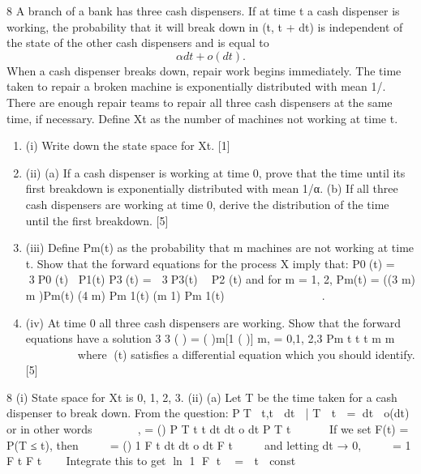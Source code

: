 \documentclass[a4paper,12pt]{article}
\begin{document}
8 A branch of a bank has three cash dispensers. If at time t a cash dispenser is working,
the probability that it will break down in (t, t + dt) is independent of the state of the
other cash dispensers and is equal to
\[\alpha dt + o(dt).\]
When a cash dispenser breaks down, repair work begins immediately. The time taken
to repair a broken machine is exponentially distributed with mean 1/\beta. There are
enough repair teams to repair all three cash dispensers at the same time, if necessary.
Define Xt as the number of machines not working at time t.
\begin{enumerate}
\item (i) Write down the state space for Xt. [1]
\item (ii) (a) If a cash dispenser is working at time 0, prove that the time until its
first breakdown is exponentially distributed with mean 1/α.
(b) If all three cash dispensers are working at time 0, derive the
distribution of the time until the first breakdown. [5]
\item (iii) Define Pm(t) as the probability that m machines are not working at time t.
Show that the forward equations for the process X imply that:
P0(t) = 3P0 (t) P1(t)
P3(t) =  3P3(t)  P2 (t)
and for m = 1, 2,
Pm(t) = ((3 m) m )Pm(t) (4 m) Pm 1(t) (m 1) Pm 1(t)              .
\item 
(iv) At time 0 all three cash dispensers are working. Show that the forward
equations have a solution
3 3
( ) = ( )m[1 ( )] m, = 0,1, 2,3
Pm t t t m
m

 
   
 
where (t) satisfies a differential equation which you should identify. [5]
\end{enumerate}
\newpage
8 (i) State space for Xt is {0, 1, 2, 3}.
(ii) (a) Let T be the time taken for a cash dispenser to break down. From the
question:
PT t,t  dt  | T  t  = dt  o(dt)
or in other words
   
 
,
= ()
P T t t dt
dt o dt
P T t
 
 

If we set F(t) = P(T ≤ t), then
 
 
= ()
1
F t dt
dt o dt
F t

 

and letting dt → 0,
 
 
=
1
F t
F t



Integrate this to get ln 1 F t  =  t  const
\end{document}
